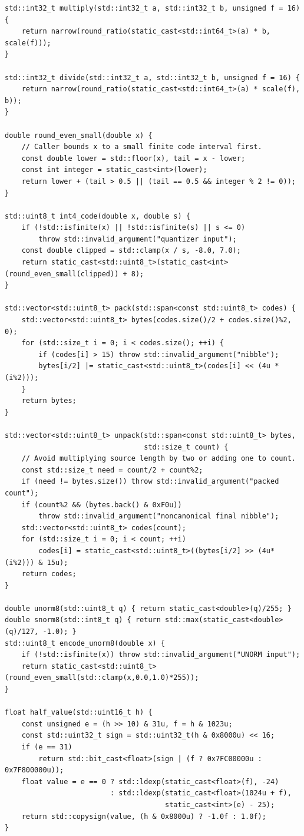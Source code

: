 \begin{verbatim}
std::int32_t multiply(std::int32_t a, std::int32_t b, unsigned f = 16) {
    return narrow(round_ratio(static_cast<std::int64_t>(a) * b, scale(f)));
}

std::int32_t divide(std::int32_t a, std::int32_t b, unsigned f = 16) {
    return narrow(round_ratio(static_cast<std::int64_t>(a) * scale(f), b));
}

double round_even_small(double x) {
    // Caller bounds x to a small finite code interval first.
    const double lower = std::floor(x), tail = x - lower;
    const int integer = static_cast<int>(lower);
    return lower + (tail > 0.5 || (tail == 0.5 && integer % 2 != 0));
}

std::uint8_t int4_code(double x, double s) {
    if (!std::isfinite(x) || !std::isfinite(s) || s <= 0)
        throw std::invalid_argument("quantizer input");
    const double clipped = std::clamp(x / s, -8.0, 7.0);
    return static_cast<std::uint8_t>(static_cast<int>(round_even_small(clipped)) + 8);
}

std::vector<std::uint8_t> pack(std::span<const std::uint8_t> codes) {
    std::vector<std::uint8_t> bytes(codes.size()/2 + codes.size()%2, 0);
    for (std::size_t i = 0; i < codes.size(); ++i) {
        if (codes[i] > 15) throw std::invalid_argument("nibble");
        bytes[i/2] |= static_cast<std::uint8_t>(codes[i] << (4u * (i%2)));
    }
    return bytes;
}

std::vector<std::uint8_t> unpack(std::span<const std::uint8_t> bytes,
                                 std::size_t count) {
    // Avoid multiplying source length by two or adding one to count.
    const std::size_t need = count/2 + count%2;
    if (need != bytes.size()) throw std::invalid_argument("packed count");
    if (count%2 && (bytes.back() & 0xF0u))
        throw std::invalid_argument("noncanonical final nibble");
    std::vector<std::uint8_t> codes(count);
    for (std::size_t i = 0; i < count; ++i)
        codes[i] = static_cast<std::uint8_t>((bytes[i/2] >> (4u*(i%2))) & 15u);
    return codes;
}

double unorm8(std::uint8_t q) { return static_cast<double>(q)/255; }
double snorm8(std::int8_t q) { return std::max(static_cast<double>(q)/127, -1.0); }
std::uint8_t encode_unorm8(double x) {
    if (!std::isfinite(x)) throw std::invalid_argument("UNORM input");
    return static_cast<std::uint8_t>(round_even_small(std::clamp(x,0.0,1.0)*255));
}

float half_value(std::uint16_t h) {
    const unsigned e = (h >> 10) & 31u, f = h & 1023u;
    const std::uint32_t sign = std::uint32_t(h & 0x8000u) << 16;
    if (e == 31)
        return std::bit_cast<float>(sign | (f ? 0x7FC00000u : 0x7F800000u));
    float value = e == 0 ? std::ldexp(static_cast<float>(f), -24)
                         : std::ldexp(static_cast<float>(1024u + f),
                                      static_cast<int>(e) - 25);
    return std::copysign(value, (h & 0x8000u) ? -1.0f : 1.0f);
}


\end{verbatim}
